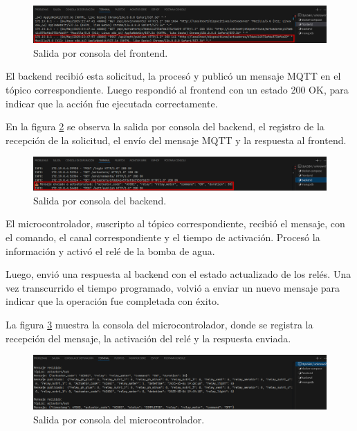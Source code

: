 \begin{figure}[H]
    \centering
    \includegraphics[width=\textwidth]{Images/59_prueba_integral_2.png}
    \caption[Salida por consola del frontend]{Salida por consola del frontend.}
    \label{fig:prueba_integral_2}
\end{figure}

El backend recibió esta solicitud, la procesó y publicó un mensaje MQTT en el
tópico correspondiente. Luego respondió al frontend con un estado 200 OK, para
indicar que la acción fue ejecutada correctamente.

En la figura \ref{fig:prueba_integral_3} se observa la salida por consola del
backend, el registro de la recepción de la solicitud, el envío del mensaje MQTT
y la respuesta al frontend.

\begin{figure}[H]
    \centering
    \includegraphics[width=\textwidth]{Images/59_prueba_integral_3.png}
    \caption[Salida por consola del backend]{Salida por consola del backend.}
    \label{fig:prueba_integral_3}
\end{figure}

El microcontrolador, suscripto al tópico correspondiente, recibió el mensaje,
con el comando, el canal correspondiente y el tiempo de activación. Procesó la
información y activó el relé de la bomba de agua.

Luego, envió una respuesta al backend con el estado actualizado de los relés.
Una vez transcurrido el tiempo programado, volvió a enviar un nuevo mensaje
para indicar que la operación fue completada con éxito.

La figura \ref{fig:prueba_integral_4} muestra la consola del microcontrolador,
donde se registra la recepción del mensaje, la activación del relé y la
respuesta enviada.

\begin{figure}[H]
    \centering
    \includegraphics[width=\textwidth]{Images/59_prueba_integral_4.png}
    \caption[Salida por consola del microcontrolador]{Salida por consola del microcontrolador.}
    \label{fig:prueba_integral_4}
\end{figure}

